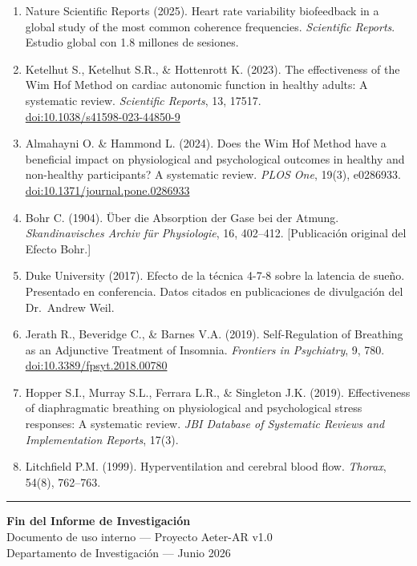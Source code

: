 \documentclass[12pt,a4paper]{article}
\begin{document}
\begin{enumerate}[itemsep=4pt]
    \item Nature Scientific Reports (2025). Heart rate variability biofeedback
          in a global study of the most common coherence frequencies.
          \textit{Scientific Reports}. Estudio global con 1.8 millones de
          sesiones.

    \item Ketelhut S., Ketelhut S.R., \& Hottenrott K. (2023). The
          effectiveness of the Wim Hof Method on cardiac autonomic function
          in healthy adults: A systematic review. \textit{Scientific Reports},
          13, 17517. \\
          \href{https://doi.org/10.1038/s41598-023-44850-9}{doi:10.1038/s41598-023-44850-9}

    \item Almahayni O. \& Hammond L. (2024). Does the Wim Hof Method have a
          beneficial impact on physiological and psychological outcomes in
          healthy and non-healthy participants? A systematic review.
          \textit{PLOS One}, 19(3), e0286933. \\
          \href{https://doi.org/10.1371/journal.pone.0286933}{doi:10.1371/journal.pone.0286933}

    \item Bohr C. (1904). Über die Absorption der Gase bei der Atmung.
          \textit{Skandinavisches Archiv für Physiologie}, 16, 402--412.
          [Publicación original del Efecto Bohr.]

    \item Duke University (2017). Efecto de la técnica 4-7-8 sobre la
          latencia de sueño. Presentado en conferencia. Datos citados en
          publicaciones de divulgación del Dr.~Andrew Weil.

    \item Jerath R., Beveridge C., \& Barnes V.A. (2019). Self-Regulation
          of Breathing as an Adjunctive Treatment of Insomnia.
          \textit{Frontiers in Psychiatry}, 9, 780. \\
          \href{https://doi.org/10.3389/fpsyt.2018.00780}{doi:10.3389/fpsyt.2018.00780}

    \item Hopper S.I., Murray S.L., Ferrara L.R., \& Singleton J.K. (2019).
          Effectiveness of diaphragmatic breathing on physiological and
          psychological stress responses: A systematic review. \textit{JBI
          Database of Systematic Reviews and Implementation Reports}, 17(3).

    \item Litchfield P.M. (1999). Hyperventilation and cerebral blood flow.
          \textit{Thorax}, 54(8), 762--763.

\end{enumerate}

\vspace{0.8cm}
\begin{center}
\rule{0.5\textwidth}{0.4pt}
\end{center}
\vspace{0.3cm}

\begin{center}
{\small \textbf{Fin del Informe de Investigación}} \\[0.1cm]
{\small Documento de uso interno — Proyecto Aeter-AR v1.0} \\[0.1cm]
{\small Departamento de Investigación — Junio 2026}
\end{center}
\end{document}
